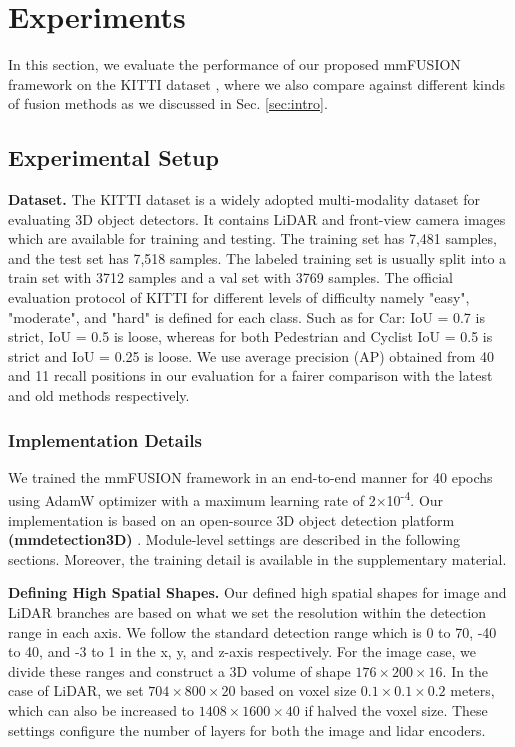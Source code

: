 \documentclass[10pt,twocolumn,letterpaper]{article}
\begin{document}
\section{Experiments}
In this section, we evaluate the performance of our proposed mmFUSION framework on the KITTI dataset \cite{Geiger2012CVPR}, where we also compare against different kinds of fusion methods as we discussed in Sec. \ref{sec:intro}.
\subsection{Experimental Setup}
\textbf{Dataset.}
The KITTI dataset  is a widely adopted multi-modality dataset for evaluating 3D object detectors. It contains LiDAR and  front-view camera images which are available for training and testing. The training set has 7,481 samples, and the test set has 7,518 samples. The labeled training set is usually split into a train set with 3712 samples and a val set with 3769 samples. The official evaluation protocol of KITTI for different levels of difficulty namely "easy", "moderate", and "hard" is defined for each class. Such as for Car: IoU = 0.7 is strict, IoU = 0.5 is loose, whereas for both Pedestrian and Cyclist IoU = 0.5 is strict and IoU = 0.25 is loose. We use average precision (AP) obtained from 40 and 11 recall positions in our evaluation for a fairer comparison with the latest and old methods respectively. 

\subsubsection{Implementation Details} 
We trained the mmFUSION framework in an end-to-end manner for 40 epochs using AdamW optimizer with a maximum learning rate of 2$\times$10\textsuperscript{-4}. Our implementation is based on an open-source 3D object detection platform \textbf{(mmdetection3D)} \cite{contributors2020mmdetection3d}. Module-level settings are described in the following sections. Moreover, the training detail is available in the supplementary material. 

\textbf{Defining High Spatial Shapes.}
Our defined high spatial shapes for image and LiDAR branches are based on what we set the resolution within the detection range in each axis. We follow the standard detection range which is 0 to 70, -40 to 40, and -3 to 1 in the x, y, and z-axis respectively. For the image case, we divide these ranges and construct a 3D volume of shape $176\times200\times16$. In the case of LiDAR, we set $704\times800\times20$ based on voxel size $0.1\times0.1\times0.2$ meters, which can also be increased to $1408\times1600\times40$ if halved the voxel size. These settings configure the number of layers for both the image and lidar encoders. 
\end{document}

